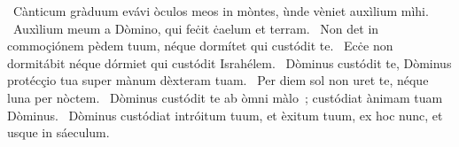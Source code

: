 {~Cànticum gràduum}
{%
evávi òculos meos in mòntes, ùnde vèniet auxìlium mìhi.
~Auxìlium meum a Dòmino, qui feċit ċaelum et terram.
~Non det in commoçiónem pèdem tuum, néque dormítet qui custódit te.
~Ecċe non dormitábit néque dórmiet qui custódit Israhélem.
~Dòminus custódit te, Dòminus protécçio tua super mànum dèxteram tuam.
~Per diem sol non uret te, néque luna per nòctem.
~Dòminus custódit te ab òmni màlo~; custódiat ànimam tuam Dòminus.
~Dòminus custódiat intróitum tuum, et èxitum tuum, ex hoc nunc, et usque in sáeculum.
}
